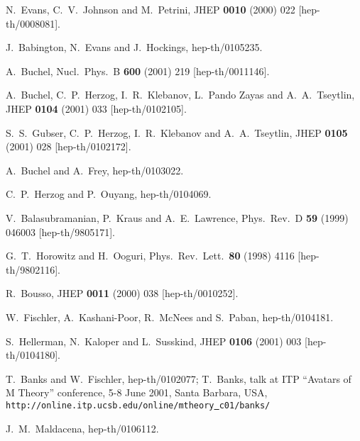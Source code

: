 \documentclass[a4paper,12pt]{amsproc}
\numberwithin{equation}{section}
\newcommand{\ul}[1]{\underline{#1}} %
\begin{document}
\begin{thebibliography}{99}
 N.~Evans, C.~V.~Johnson and M.~Petrini,
JHEP {\bf 0010} (2000) 022 [hep-th/0008081].

 J.~Babington, N.~Evans and J.~Hockings,
hep-th/0105235.

 A.~Buchel,
Nucl.\ Phys.\ B {\bf 600} (2001) 219
[hep-th/0011146].

 A.~Buchel, C.~P.~Herzog, I.~R.~Klebanov, L.~Pando
Zayas and A.~A.~Tseytlin,
JHEP {\bf 0104} (2001) 033 [hep-th/0102105].

 S.~S.~Gubser, C.~P.~Herzog, I.~R.~Klebanov and
A.~A.~Tseytlin,
JHEP {\bf 0105} (2001) 028 [hep-th/0102172].

 A.~Buchel and A.~Frey,
hep-th/0103022.

 C.~P.~Herzog and P.~Ouyang,
hep-th/0104069.

 V.~Balasubramanian, P.~Kraus and A.~E.~Lawrence,
Phys.\ Rev.\ D {\bf 59} (1999) 046003
[hep-th/9805171].

 G.~T.~Horowitz and H.~Ooguri,
Phys.\ Rev.\ Lett.\  {\bf 80} (1998) 4116
[hep-th/9802116].

 R.~Bousso,
JHEP {\bf 0011} (2000) 038
[hep-th/0010252].

 W.~Fischler, A.~Kashani-Poor, R.~McNees and S.~Paban,
hep-th/0104181.

 S.~Hellerman, N.~Kaloper and L.~Susskind,
JHEP {\bf 0106} (2001) 003
[hep-th/0104180].

 T.~Banks and W.~Fischler,
hep-th/0102077; T.~Banks, talk at ITP ``Avatars of M Theory''
conference, 5-8 June 2001, Santa Barbara, USA,
{\tt http://online.itp.ucsb.edu/online/mtheory{\ul{\
}}c01/banks/}

 J.~M.~Maldacena, 
hep-th/0106112.

\end{thebibliography}
\end{document}
